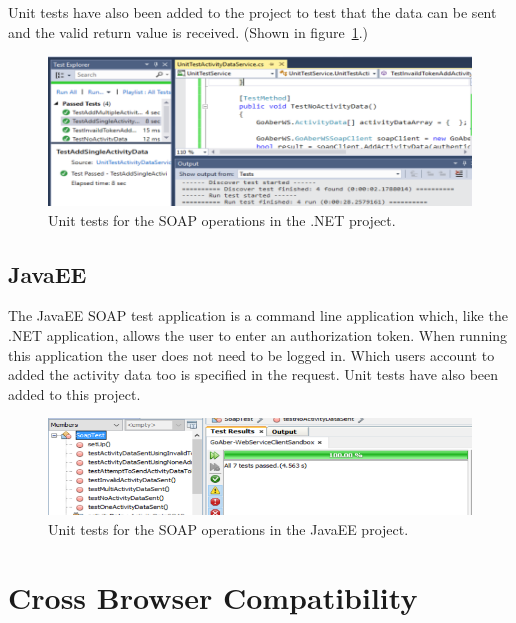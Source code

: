 Unit tests have also been added to the project to test that the data can be sent and the valid return value is received. (Shown in figure~\ref{fig:testing_SoapUnitTestsNET}.)

\begin{figure}[H]
\begin{center}
\includegraphics[scale=0.3]{images/testing/SoapUnitTestsNET.png} 
\caption{Unit tests for the SOAP operations in the .NET project.}
\label{fig:testing_SoapUnitTestsNET}
\end{center}
\end{figure}


\subsection{JavaEE}

The JavaEE SOAP test application is a command line application which, like the .NET application, allows the user to enter an authorization token. When running this application the user does not need to be logged in. Which users account to added the activity data too is specified in the request. Unit tests have also been added to this project.

\begin{figure}[H]
\begin{center}
\includegraphics[scale=0.3]{images/testing/SoapUnitTestsJavaEE.png} 
\caption{Unit tests for the SOAP operations in the JavaEE project.}
\label{fig:testing_SoapUnitTestsJavaEE}
\end{center}
\end{figure}


\section{Cross Browser Compatibility}

